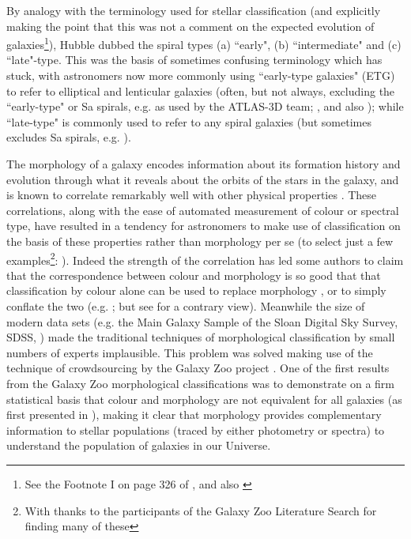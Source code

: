 \documentclass[usenatbib]{mn2e}
\begin{document}
By analogy with the terminology used for stellar classification (and explicitly making the point that this was not a comment on the expected evolution of galaxies\footnote{See the Footnote I on page 326 of \citet{Hubble1926}, and also \citet{Baldry2008AG}}), Hubble dubbed the spiral types (a) ``early",  (b) ``intermediate" and (c) ``late"-type. This was the basis of sometimes confusing terminology which has stuck, with astronomers now more commonly using ``early-type galaxies"  (ETG) to refer to elliptical and lenticular galaxies (often, but not always, excluding the ``early-type" or Sa spirals, e.g. as used by the ATLAS-3D team; \citealt{2011MNRAS.413..813C,2011MNRAS.416.1680C}, and also \citealt{Stanford1998}); while ``late-type" is commonly used to refer to any spiral galaxies (but sometimes excludes Sa spirals, e.g. \citealt{Strateva2001}).

The morphology of a galaxy encodes information about its formation history and evolution through what it reveals about the orbits of the stars in the galaxy, and is known to correlate remarkably well with other physical properties \citep[e.g. star formation rate, gas content, stellar mass][]{RobertsHaynes1994, Kennicutt1998, Strateva2001}. These correlations, along with the ease of automated measurement of colour or spectral type, have resulted in a tendency for astronomers to make use of classification on the basis of these properties rather than morphology per se (to select just a few examples\footnote{With thanks to the participants of the Galaxy Zoo Literature Search for finding many of these}: \citealt{Bell2004, Weinmann2006, vandenBosch2008, Cooper2010, Zehavi2011}). Indeed the strength of the correlation has led some authors to claim that the correspondence between colour and morphology is so good that that classification by colour alone can be used to replace morphology \citep[e.g.][]{ParkChoi2005, Faber2007, AscasibarAlmeida2011}, or to simply conflate the two (e.g. \citealt{TalvanDokkum2011}; but see \citealt{vandenBergh2007} for a contrary view). Meanwhile the size of modern data sets (e.g. the Main Galaxy Sample of the Sloan Digital Sky Survey, SDSS, \citealt{Strauss2002}) made the traditional techniques of morphological classification by small numbers of experts implausible. This problem was solved making use of the technique of crowdsourcing by the Galaxy Zoo project \citep{Lintott2008,Lintott2011}. One of the first results from the Galaxy Zoo morphological classifications was to demonstrate on a firm statistical basis that colour and morphology are not equivalent for all galaxies (as first presented in \citealt{Bamford2009, Schawinski2009,Masters2010}), making it clear that morphology provides complementary information to stellar populations (traced by either photometry or spectra) to understand the population of galaxies in our Universe.   
\end{document}
